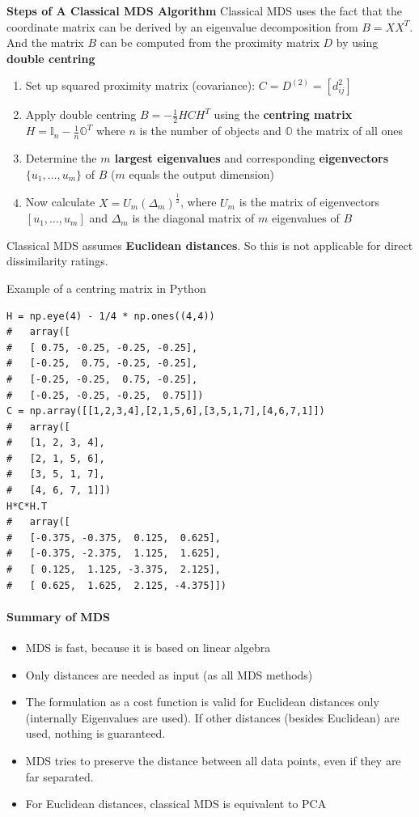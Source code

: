 \documentclass[11pt]{article}
\theoremstyle{definition}
\begin{document}
\vspace{1em}
\noindent
\textbf{Steps of A Classical MDS Algorithm}
Classical MDS uses the fact that the coordinate matrix can be derived by an eigenvalue decomposition from $B = XX^T$. And the matrix $B$ can be computed from the proximity matrix $D$ by using \textbf{double centring}

\begin{enumerate}
	\item Set up squared proximity matrix (covariance): $C = D^{(2)} = [d_{ij}^2]$
	\item Apply double centring $B = -\frac{1}{2} HCH^T$ using the \textbf{centring matrix} $H = \mathbb{I}_n - \frac{1}{n} \mathbb{O}^T $ where $n$ is the number of objects and $\mathbb{O}$ the matrix of all ones
	\item Determine the \textbf{$m$ largest eigenvalues} and corresponding \textbf{eigenvectors} $\{u_1,\dots,u_m\}$ of $B$ ($m$ equals the output dimension)
	\item Now calculate $X = U_m (\Delta_m)^{\frac{1}{2}}$, where $U_m$ is the matrix of eigenvectors $[u_1,\dots,u_m]$ and $\Delta_m$ is the diagonal matrix of $m$ eigenvalues of $B$ 
\end{enumerate}
Classical MDS assumes \textbf{Euclidean distances}. So this is not applicable for direct dissimilarity ratings.

Example of a centring matrix in Python
\begin{verbatim}
H = np.eye(4) - 1/4 * np.ones((4,4))
#   array([
#   [ 0.75, -0.25, -0.25, -0.25],
#   [-0.25,  0.75, -0.25, -0.25],
#   [-0.25, -0.25,  0.75, -0.25],
#   [-0.25, -0.25, -0.25,  0.75]])
C = np.array([[1,2,3,4],[2,1,5,6],[3,5,1,7],[4,6,7,1]])
#   array([
#   [1, 2, 3, 4],
#   [2, 1, 5, 6],
#   [3, 5, 1, 7],
#   [4, 6, 7, 1]])
H*C*H.T
#   array([
#   [-0.375, -0.375,  0.125,  0.625],
#   [-0.375, -2.375,  1.125,  1.625],
#   [ 0.125,  1.125, -3.375,  2.125],
#   [ 0.625,  1.625,  2.125, -4.375]])
\end{verbatim}

\paragraph{Summary of MDS}
\begin{itemize}
	\item MDS is fast, because it is based on linear algebra
	\item Only distances are needed as input (as all MDS methods)
	\item The formulation as a cost function is valid for Euclidean distances only (internally Eigenvalues are used). If other distances (besides Euclidean) are used, nothing is guaranteed.
	\item MDS tries to preserve the distance between all data points, even if they are far separated.
	\item For Euclidean distances, classical MDS is equivalent to PCA	
\end{itemize}
\end{document}
